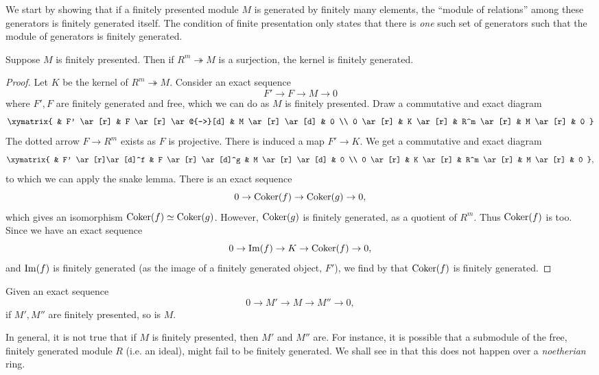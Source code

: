 We start by showing that if a finitely presented module $M$ is generated by
finitely many elements, the ``module of relations'' among these generators is
finitely generated itself. The condition of finite presentation only states that
there is \emph{one} such set of generators such that the module of generators
is finitely generated. 
\begin{proposition} 
Suppose $M$ is finitely presented. Then if $R^m \twoheadrightarrow M$ is a
surjection, the kernel is finitely generated.
\end{proposition} 
\begin{proof} Let $K$ be the kernel of $R^m \twoheadrightarrow M$.
Consider an exact sequence
\[ F' \to F \to M \to 0 \]
where $F', F$ are finitely generated and free, which we can do as $M$ is
finitely presented.
Draw a commutative and exact diagram
\[ 
\xymatrix{
& F' \ar[r] &  F \ar[r] \ar@{-->}[d]  &  M \ar[r] \ar[d]  &  0 \\
0 \ar[r] &  K \ar[r] &  R^m \ar[r] &  M \ar[r] &  0
}
\]
The dotted arrow $F \to R^m$ exists as $F$ is projective. There is induced a
map $F' \to K$. 
We get a commutative and exact diagram
\[ 
\xymatrix{
& F' \ar[r]\ar[d]^f  &  F \ar[r] \ar[d]^g  &  M \ar[r] \ar[d]  &  0 \\
0 \ar[r] &  K \ar[r] &  R^m \ar[r] &  M \ar[r] &  0
},
\]
to which we can apply the snake lemma. There is an exact sequence
\[ 0 \to \operatorname{Coker}(f) \to \operatorname{Coker}(g) \to 0,  \]
which gives an isomorphism $\operatorname{Coker}(f) \simeq \operatorname{Coker}(g)$.
However, $\operatorname{Coker}(g)$ is finitely generated, as a quotient of $R^m$.
Thus $\operatorname{Coker}(f)$ is too.
Since we have an exact sequence
\[ 0 \to \operatorname{Im}(f) \to K \to \operatorname{Coker}(f) \to 0,  \]
and $\operatorname{Im}(f)$ is finitely generated (as the image of a finitely generated
object, $F'$), we find by  that $\operatorname{Coker}(f)$ is finitely generated.
\end{proof} 

\begin{proposition} \label{exact-finpres}
Given an exact sequence
\[ 0 \to M' \to M \to M'' \to 0,  \]
if $M', M''$ are finitely presented, so is $M$.
\end{proposition} 

In general, it is not true that if $M$ is finitely presented, then $M'$ and
$M''$ are. For instance, it is possible that a submodule of the free, finitely
generated module $R$ (i.e. an ideal), might fail to be finitely generated. We
shall see in  that this does not happen over a
\emph{noetherian} ring.

